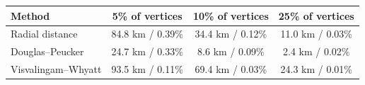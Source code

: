 \begin{tabular}{lccc}
\toprule
Method & 5\% of vertices & 10\% of vertices & 25\% of vertices \\
\midrule
Radial distance & 84.8 km / 0.39\% & 34.4 km / 0.12\% & 11.0 km / 0.03\% \\
Douglas–Peucker & 24.7 km / 0.33\% & 8.6 km / 0.09\% & 2.4 km / 0.02\% \\
Visvalingam–Whyatt & 93.5 km / 0.11\% & 69.4 km / 0.03\% & 24.3 km / 0.01\% \\
\bottomrule
\end{tabular}